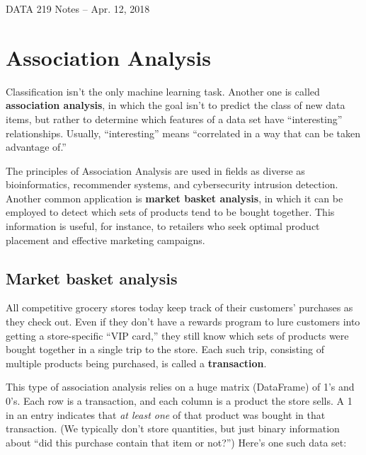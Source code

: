\documentclass[12pt]{article}
\begin{document}
\begin{center}
\begin{Large}
DATA 219 Notes -- Apr. 12, 2018
\end{Large}
\end{center}

\section{Association Analysis}

Classification isn't the only machine learning task. Another one is called
\textbf{association analysis}, in which the goal isn't to predict the class of
new data items, but rather to determine which features of a data set have
``interesting'' relationships. Usually, ``interesting'' means ``correlated in a
way that can be taken advantage of.''

The principles of Association Analysis are used in fields as diverse as
bioinformatics, recommender systems, and cybersecurity intrusion detection.
Another common application is \textbf{market basket analysis}, in which it can
be employed to detect which sets of products tend to be bought together. This
information is useful, for instance, to retailers who seek optimal product
placement and effective marketing campaigns.

\subsection{Market basket analysis}

All competitive grocery stores today keep track of their customers' purchases
as they check out. Even if they don't have a rewards program to lure customers
into getting a store-specific ``VIP card,'' they still know which sets of
products were bought together in a single trip to the store. Each such trip,
consisting of multiple products being purchased, is called a
\textbf{transaction}.

This type of association analysis relies on a huge matrix (DataFrame) of 1's
and 0's. Each row is a transaction, and each column is a product the store
sells. A 1 in an entry indicates that \textit{at least one} of that product
was bought in that transaction. (We typically don't store quantities, but just
binary information about ``did this purchase contain that item or not?'')
Here's one such data set:
\end{document}

